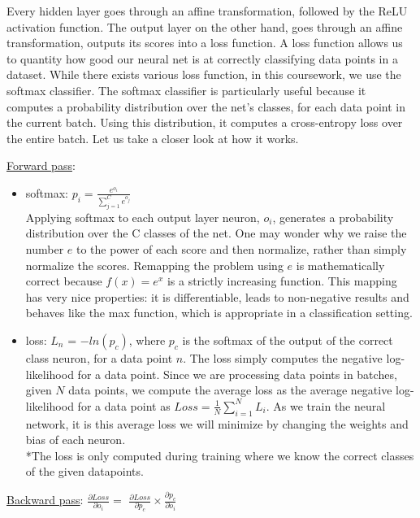 
Every hidden layer goes through an affine transformation, followed by the ReLU activation function.
The output layer on the other hand,  goes through an affine transformation, outputs its scores into a loss function.
A loss function allows us to quantity how good our neural net is at correctly classifying data points in a dataset.
While there exists various loss function, in this coursework, we use the softmax classifier.
The softmax classifier is particularly useful because it computes a probability distribution over the net's classes, for each data point in the current batch.
Using this distribution, it computes a cross-entropy loss over the entire batch.
Let us take a closer look at how it works.

\underline{Forward pass}:

\begin{itemize}[topsep=-10pt]
   \item softmax: $p_i = \frac{e^{o_i}}{\sum_{j=1}^{C} e^{o_j}}$\\
     Applying softmax to each output layer neuron, $o_i$, generates a probability distribution over the C classes of the net.
     One may wonder why we raise the number $e$ to the power of each score and then normalize,
     rather than simply normalize the scores. Remapping the problem using $e$ is mathematically correct because
     $f(x) = e^x$ is a strictly increasing function.
     This mapping has very nice properties: it is differentiable, leads to non-negative results and behaves like the max function,
     which is appropriate in a classification setting.
     
   \item loss: $L_n$ = $-ln(p_c)$, where $p_c$ is the softmax of the output of the correct class neuron, for a data point $n$.
     The loss simply computes the negative log-likelihood for a data point.
     Since we are processing data points in batches, given $N$ data points,
     we compute the average loss as the average negative log-likelihood for a data point as $Loss = \frac{1}{N}\sum_{i=1}^{N}L_i$.
     As we train the neural network, it is this average loss we will minimize by changing the weights and bias of each neuron.\\
     *The loss is only computed during training where we know the correct classes of the given datapoints.\\
          
\end{itemize}


\underline{Backward pass}: $\frac{\partial Loss}{\partial o_i} = $
$\frac{\partial Loss}{\partial p_c} \times \frac{\partial p_c}{\partial o_i}$

